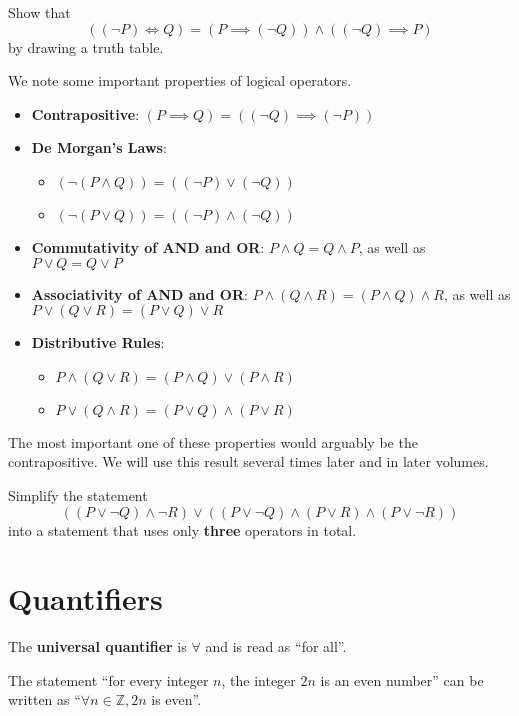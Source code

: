 \begin{exercise}
    Show that
    \[
        ((\lnot P) \iff Q) = (P \implies (\lnot Q)) \land ((\lnot Q) \implies P)
    \]
    by drawing a truth table.
\end{exercise}

We note some important properties of logical operators.
\begin{itemize}
    \item \textbf{Contrapositive}: $(P \implies Q) = ((\lnot Q) \implies (\lnot P))$
    \item \textbf{De Morgan's Laws}: \begin{itemize}
        \item $(\lnot (P \land Q)) = ((\lnot P) \lor (\lnot Q))$
        \item $(\lnot (P \lor Q)) = ((\lnot P) \land (\lnot Q))$
    \end{itemize}
    \item \textbf{Commutativity of AND and OR}: $P \land Q = Q \land P$, as well as $P \lor Q = Q \lor P$
    \item \textbf{Associativity of AND and OR}: $P \land (Q \land R) = (P \land Q) \land R$, as well as $P \lor (Q \lor R) = (P \lor Q) \lor R$
    \item \textbf{Distributive Rules}: \begin{itemize}
        \item $P \land (Q \lor R) = (P \land Q) \lor (P \land R)$
        \item $P \lor (Q \land R) = (P \lor Q) \land (P \lor R)$
    \end{itemize}
\end{itemize}
\begin{remark}
    The most important one of these properties would arguably be the contrapositive. We will use this result several times later and in later volumes.
\end{remark}
\begin{exercise}
    Simplify the statement
    \[
        ((P \lor \lnot Q) \land \lnot R) \lor ((P \lor \lnot Q) \land (P \lor R) \land (P \lor \lnot R))
    \]
    into a statement that uses only \textbf{three} operators in total.
\end{exercise}

\section{Quantifiers}
\begin{definition}
    The \textbf{universal quantifier} is $\forall$ and is read as ``for all''.
\end{definition}
\begin{example}
    The statement ``for every integer $n$, the integer $2n$ is an even number'' can be written as ``$\forall n \in \mathbb{Z}, 2n$ is even''.
\end{example}

